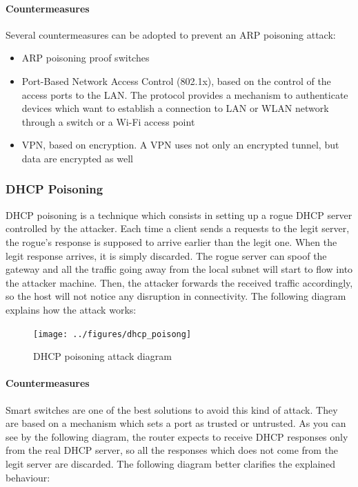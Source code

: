 \documentclass[draft]{article}
\begin{document}
\paragraph{Countermeasures}
Several countermeasures can be adopted to prevent an \ac{ARP} poisoning attack:
\begin{itemize}
  \item \ac{ARP} poisoning proof switches
  \item Port-Based Network Access Control (802.1x), based on the control of the access ports to the LAN. The protocol provides a mechanism to authenticate devices which want to establish a connection to LAN or WLAN network through a switch or a Wi-Fi access point
  \item VPN, based on encryption. A VPN uses not only an encrypted tunnel, but data are encrypted as well
\end{itemize}

\subsubsection{DHCP Poisoning}
\ac{DHCP} poisoning is a technique which consists in setting up a rogue \ac{DHCP}  server controlled by the attacker.
Each time a client sends a requests to the legit server, the rogue's response is supposed to arrive earlier than the legit one.
When the legit response arrives, it is simply discarded.
The rogue server can spoof the gateway and all the traffic going away from the local subnet will start to flow into the attacker machine.
Then, the attacker forwards the received traffic accordingly, so the host will not notice any disruption in connectivity.
The following diagram explains how the attack works:
\begin{figure}[h]
\center
\texttt{[image: ../figures/dhcp\_poisong]}
\caption{DHCP poisoning attack diagram}
\end{figure}
\paragraph{Countermeasures}
Smart switches are one of the best solutions to avoid this kind of attack. They are based on a mechanism which sets a port as trusted or untrusted. As you can see by the following diagram, the router expects to receive DHCP responses only from the real DHCP server, so all the responses which does not come from the legit server are discarded. The following diagram better clarifies the explained behaviour:
\end{document}
